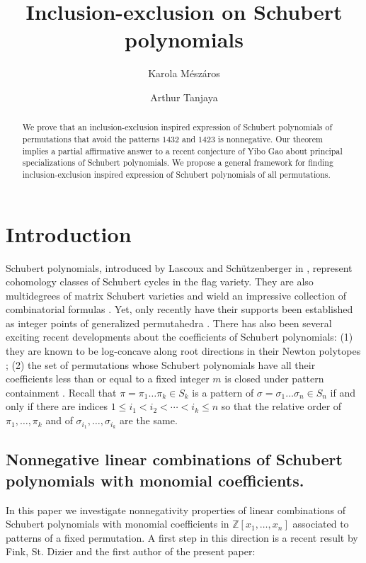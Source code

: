 \documentclass{amsart}
\title{Inclusion-exclusion on Schubert polynomials}
\author{Karola M\'esz\'aros}
\author{Arthur Tanjaya}
\theoremstyle{definition}
\theoremstyle{named}
\def\Z{\mathbb{Z}}
\begin{document}
	\begin{abstract}   We prove that an inclusion-exclusion inspired  expression of Schubert polynomials of permutations that avoid  the patterns $1432$ and $1423$ is nonnegative. Our theorem implies a partial affirmative answer to a   recent conjecture of Yibo Gao about principal specializations of  Schubert polynomials.  We propose a general framework for finding   inclusion-exclusion inspired  expression of Schubert polynomials of all permutations.   \end{abstract}

	\maketitle

	\section{Introduction}
	Schubert polynomials, introduced  by Lascoux and Sch\"utzenberger in \cite{LS1}, represent cohomology classes of Schubert cycles in the flag variety. They are also multidegrees of matrix Schubert varieties \cite{multidegree} and  wield an impressive collection of   combinatorial formulas \cite{laddermoves, BJS, FK1993, nilcoxeter, thomas, lenart, manivel, prismtableaux}. Yet, only recently have their supports been established as integer points of generalized permutahedra \cite{FMS, MTY}. There has also been several exciting recent developments about the coefficients of Schubert polynomials: (1) they are  known to be log-concave along root directions in their Newton polytopes \cite{june}; (2) the set of permutations whose Schubert polynomials have all their coefficients less than or equal to a fixed integer $m$ is closed under pattern containment \cite{zeroone}. Recall that $\pi=\pi_1\ldots \pi_k \in S_k$ is a pattern of $\sigma=\sigma_1\ldots \sigma_n \in S_n$ if and only if there are indices $1\leq i_1<i_2<\cdots<i_k\leq n$ so that the relative order of  
	$\pi_1, \ldots, \pi_k$ and of $\sigma_{i_1}, \ldots, \sigma_{i_k}$ are the same.  

	\subsection{Nonnegative linear combinations of Schubert polynomials with monomial coefficients.} In this paper we investigate nonnegativity properties of linear combinations   of Schubert polynomials with monomial coefficients in $\Z[x_1, \ldots, x_n]$ associated to patterns of a fixed permutation.  A first step in this direction is a recent result by Fink, St. Dizier and the first author of the present paper: 	 
\end{document}
